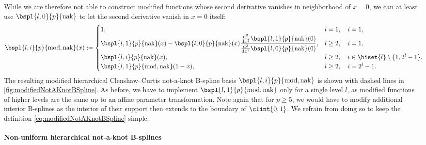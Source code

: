 While we are therefore not able to construct modified functions
whose second derivative vanishes in neighborhood of $x = 0$,
we can at least use $\bspl{l,0}{p}{\nak}$ to let the
second derivative vanish in $x = 0$ itself:
\begin{equation}
  \label{eq:modifiedNotAKnotBSpline}
  \bspl{l,i}{p}{\modified,\nak}(x)
  :=
  \begin{cases}
    1,&
    l = 1,\quad i = 1,\\
    \bspl{l,1}{p}{\nak}(x)
    - \bspl{l,0}{p}{\nak}(x)
    \dfrac{\frac{\diff^2}{\dx^2} \bspl{l,1}{p}{\nak}(0)}%
    {\frac{\diff^2}{\dx^2} \bspl{l,0}{p}{\nak}(0)},&
    l \ge 2,\quad i = 1,\\
    \bspl{l,i}{p}{\nak}(x),&
    l \ge 2,\quad i \in \hiset{l} \setminus \{1, 2^l - 1\},\\
    \bspl{l,1}{p}{\modified,\nak}(1 - x),&
    l \ge 2,\quad i = 2^l - 1.
  \end{cases}
  \hspace*{-2mm}
\end{equation}
The resulting modified hierarchical Clenshaw--Curtis not-a-knot B-spline basis
$\bspl{l,i}{p}{\modified,\nak}$ is shown with dashed lines
in \cref{fig:modifiedNotAKnotBSpline}.
As before, we have to implement $\bspl{l,1}{p}{\modified,\nak}$
only for a single level $l$, as modified functions of higher levels
are the same up to an affine parameter transformation.
Note again that for $p \ge 5$, we would have to modify additional
interior B-splines as the interior of their support then extends to the
boundary of $\clint{0, 1}$.
We refrain from doing so to keep the definition
\eqref{eq:modifiedNotAKnotBSpline} simple.

\paragraph{Non-uniform hierarchical not-a-knot B-splines}

